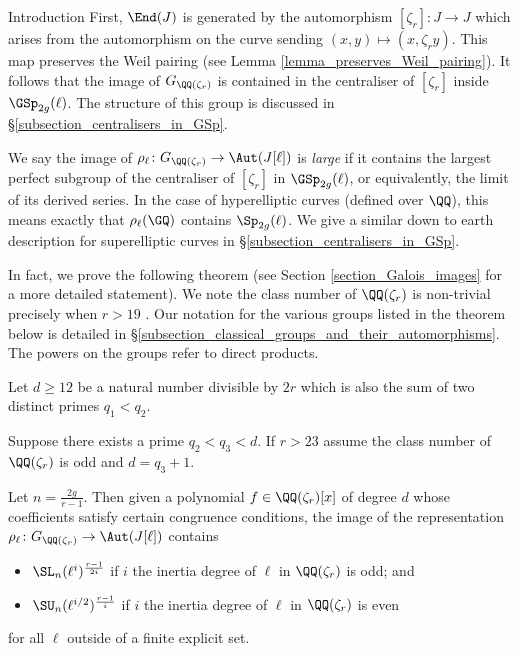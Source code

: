 \documentclass[11pt,a4paper]{article}
\newcommand{\Qr}{{\QQ(\zeta_r)}}
\newcommand{\GQr}{G_{\QQ(\zeta_{r})}}
\newcommand{\zr}{\zeta_r}
\begin{document}
\begin{section}{Introduction}
First, $\End(J)$ is generated by the automorphism $[\zr]\colon J \rightarrow J$ which arises from the automorphism on the curve sending $(x,y) \mapsto (x,\zr y)$.
 This map preserves the Weil pairing (see Lemma \ref{lemma_preserves_Weil_pairing}).
It follows that the image of $\GQr$ is contained in the centraliser of $[\zr]$ inside $\GSp_{2g}(\ell)$.
The structure of this group is discussed in \S \ref{subsection_centralisers_in_GSp}.

We say the image of $\rho_\ell \colon \GQr \rightarrow \Aut(J[\ell])$ is \emph{large} if it  contains the largest perfect subgroup of the centraliser of $[\zr]$ in $\GSp_{2g}(\ell)$, or equivalently, the limit of its derived series.
In the case of hyperelliptic curves (defined over $\QQ$), this means exactly that $\rho_\ell(\GQ)$ contains $\Sp_{2g}(\ell)$.
We give a similar down to earth description for superelliptic curves in \S \ref{subsection_centralisers_in_GSp}.

In fact, we prove the following theorem (see Section \ref{section_Galois_images} for a more detailed statement). We note the class number of $\Qr$ is non-trivial precisely when $r>19$ \cite{Masley_Montgomery_cyclotomic_fields_UFD}.
Our notation for the various groups listed in the theorem below is detailed in \S \ref{subsection_classical_groups_and_their_automorphisms}.
The powers on the groups refer to direct products.
\begin{theorem}
 Let $d \geq 12$ be a natural number divisible by $2r$ which is also the sum of two distinct primes $q_1<q_2$.

 Suppose there exists a prime $q_2<q_3<d$. If $r>23$ assume the class number of $\Qr$ is odd and $d=q_3+1$.

Let $n = \frac{2g}{r-1}$. Then given a polynomial $f \in \Qr[x]$ of degree $d$ whose coefficients satisfy certain congruence conditions, the image of the representation $\rho_\ell\colon\GQr \rightarrow \Aut(J[\ell])$ contains
\begin{itemize}
    \item $\SL_n(\ell^i)^{\frac{r-1}{2i}}$ if $i$ the inertia degree of $\ell$ in $\Qr$ is odd; and
    \item $\SU_n(\ell^{i/2})^{\frac{r-1}{i}}$ if $i$ the inertia degree of $\ell$ in $\Qr$ is even
\end{itemize}
for all $\ell$ outside of a finite explicit set. 
\end{theorem}



\end{section}
\end{document}

